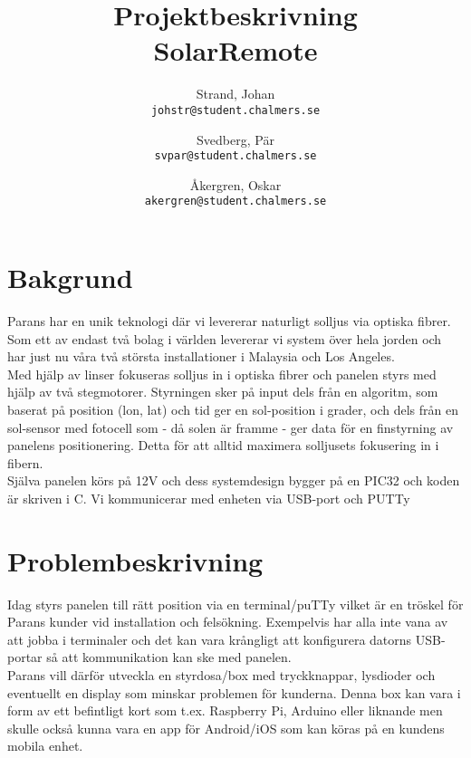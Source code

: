 \documentclass{article}
\author{	Strand, Johan \\ \texttt{johstr@student.chalmers.se} \and
			Svedberg, Pär\\ \texttt{svpar@student.chalmers.se} \and
			Åkergren, Oskar\\ \texttt{akergren@student.chalmers.se}
}
\title{Projektbeskrivning  \\ SolarRemote}
\begin{document}
	\maketitle\vspace*{-1cm}

	\section*{Bakgrund} %
	\label{sub:bakgrund}

		\noindent Parans har en unik teknologi där vi levererar naturligt solljus via optiska fibrer.
		Som ett av endast två bolag i världen levererar vi system över hela jorden och har just nu våra två största installationer i Malaysia och Los Angeles.\\

		\noindent Med hjälp av linser fokuseras solljus in i optiska fibrer och panelen styrs med hjälp av två stegmotorer. Styrningen sker på input dels från en algoritm, som baserat på position (lon, lat) och tid ger en sol-position i grader, och dels från en sol-sensor med fotocell som - då solen är framme - ger data för en finstyrning av panelens positionering.
		Detta för att alltid maximera solljusets fokusering in i fibern.\\

		\noindent Själva panelen körs på 12V och dess systemdesign bygger på en PIC32 och
		koden är skriven i C. Vi kommunicerar med enheten via USB-port och PUTTy

	\section*{Problembeskrivning} %
	\label{sub:problem}

		\noindent Idag styrs panelen till rätt position via en terminal/puTTy vilket är en tröskel för Parans kunder vid installation och felsökning. 
		Exempelvis har alla inte vana av att jobba i terminaler och det kan vara krångligt att konfigurera datorns USB-portar så att kommunikation kan ske med panelen. \\

		\noindent Parans vill därför utveckla en styrdosa/box med tryckknappar, lysdioder och eventuellt en display som minskar problemen för kunderna.
		Denna box kan vara i form av ett befintligt kort som t.ex. Raspberry Pi, Arduino eller liknande men skulle också kunna vara en app för Android/iOS som kan köras på en kundens mobila enhet.
\end{document}
